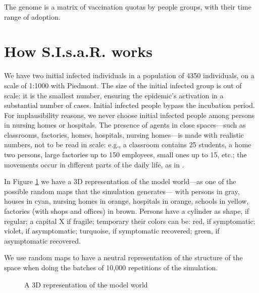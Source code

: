 \documentclass[graybox]{svmult}
\begin{document}
The genome is a matrix of vaccination quotas by people groups, with their time range of adoption. 


\section{How S.I.s.a.R. works}
\label{howWorks}

We have two initial infected individuals in a population of 4350 individuals, on a scale of 1:1000 with Piedmont. The size of the initial infected group is out of scale: it is the smallest number, ensuring the epidemic's activation in a substantial number of cases. Initial infected people bypass the incubation period. For implausibility reasons, we never choose initial infected people among persons in nursing homes or hospitals. The presence of agents in close spaces---such as classrooms, factories, homes, hospitals, nursing homes---is made with realistic numbers, not to be read in scale: e.g., a classroom contains 25 students, a home two persons, large factories up to 150 employees, small ones up to 15, etc.; the movements occur in different parts of the daily life, as in \cite{ghorbani2020assocc}.

In Figure \ref{3D} we have a 3D representation of the model world---as one of the possible random maps that the simulation generates--- with persons in gray, houses in cyan, nursing homes in orange, hospitals in orange, schools in yellow, factories (with shops and offices) in brown. Persons have a cylinder as shape, if regular; a capital X if fragile; temporary their colors can be: red, if symptomatic; violet, if asymptomatic; turquoise, if symptomatic recovered; green, if asymptomatic recovered.

We use random maps to have a neutral representation of the structure of the space when doing the batches of 10,000 repetitions of the simulation. 

\begin{figure}[t]
\center
{}
\caption{A 3D representation of the model world}
\label{3D}
\end{figure}
\end{document}
